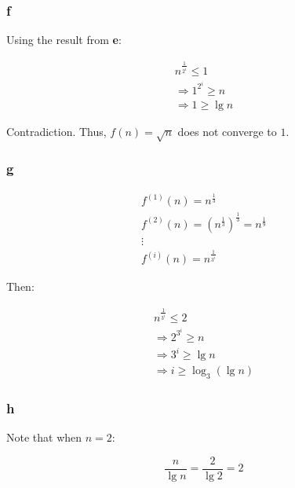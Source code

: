 \documentclass[8pt,a4paper]{article}
\begin{document}
\subsubsection*{f}

  Using the result from \textbf{e}:

\begin{equation*}
  \begin{split}
    n^{\frac{1}{2^{i}}} \leq 1 \\
    \Rightarrow 1^{2^{i}} \geq n \\
    \Rightarrow 1 \geq \lg n
  \end{split}
\end{equation*}

  Contradiction. Thus, $f(n) = \sqrt{n}$ does not converge to $1$.

\subsubsection*{g}

\begin{equation*}
  \begin{split}
    f^{(1)}(n) = n^{\frac{1}{3}} \\
    f^{(2)}(n) = \left(n^{\frac{1}{3}}\right)^{\frac{1}{3}} = n^{\frac{1}{9}} \\
    \vdots \\
    f^{(i)}(n) = n^{\frac{1}{3^{i}}}
  \end{split}
\end{equation*}

  Then:

\begin{equation*}
  \begin{split}
    n^{\frac{1}{3^{i}}} \leq 2 \\
    \Rightarrow 2^{3^{i}} \geq n \\
    \Rightarrow 3^{i} \geq \lg n \\
    \Rightarrow i \geq \log_{3}(\lg n)
  \end{split}
\end{equation*}

\subsubsection*{h}

  Note that when $n = 2$:

\begin{equation*}
  \frac{n}{\lg n} = \frac{2}{\lg 2} = 2
\end{equation*}
\end{document}
